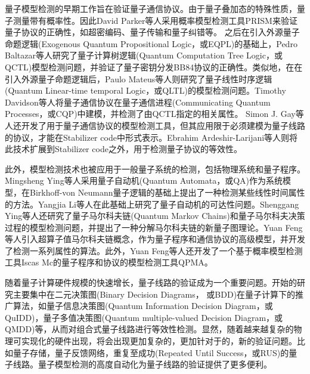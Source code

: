 量子模型检测的早期工作旨在验证量子通信协议。由于量子叠加态的特殊性质，量子测量带有概率性。因此David Parker等人采用概率模型检测工具PRISM\citep{kwiatkowska2004probabilistic}来验证量子协议的正确性，如超密编码、量子传输和量子纠错等。
之后在引入外源量子命题逻辑(Exogenous Quantum Propositional Logic，或EQPL)\citep{mateus2006weakly}的基础上，Pedro Baltazar等人研究了量子计算树逻辑(Quantum Computation Tree Logic，或QCTL)模型检测问题，并验证了量子密钥分发BB84协议\citep{bennett2014quantum}的正确性\citep{baltazar2008quantum,baltazar2007towards}。类似地，在在引入外源量子命题逻辑后，Paulo Mateus等人则研究了量子线性时序逻辑(Quantum Linear-time temporal Logic，或QLTL)的模型检测问题\citep{mateus2009temporal}。Timothy Davidson等人将量子通信协议在量子通信进程(Communicating Quantum Processes，或CQP)\citep{gay2005communicating}中建模，并检测了由QCTL指定的相关属性\citep{davidson2012formal,davidson2012model}。
Simon J. Gay等人还开发了用于量子通信协议的模型检测工具\citep{Gay,gay2010specification}，但其应用限于必须建模为量子线路的协议，才能在Stabilizer code\citep{gottesman1997stabilizer}中形式表示。Ebrahim Ardeshir-Larijani等人则将此技术扩展到Stabilizer code之外，用于检测量子协议的等效性\citep{ardeshir2013equivalence,ardeshir2014verification}。

此外，模型检测技术也被应用于一般量子系统的检测，包括物理系统和量子程序。Mingsheng Ying等人采用量子自动机(Quantum Automata，或QA)作为系统模型\citep{kondacs1997power}，在Birkhoff-von Neumann量子逻辑\citep{birkhoff1987logic}的基础上提出了一种检测某些线性时间属性的方法\citep{ying2014model}。Yangjia Li等人在此基础上研究了量子自动机的可达性问题\citep{li2014decidable}。Shenggang Ying等人还研究了量子马尔科夫链(Quantum Markov Chains)\citep{ying2013verification}和量子马尔科夫决策过程的模型检测问题，并提出了一种分解马尔科夫链的新量子图理论\citep{ying2013reachability,ying2018reachability}。Yuan Feng等人引入超算子值马尔科夫链概念，作为量子程序和通信协议的高级模型，并开发了检测一系列属性的算法\citep{feng2013model,feng2013reachability,feng2017model}。此外，Yuan Feng等人还开发了一个基于概率模型检测工具Iscas Mc\citep{hahn2014iscas}的量子程序和协议的模型检测工具QPMA\citep{feng2015qpmc}。

随着量子计算硬件规模的快速增长，量子线路的验证成为一个重要问题。开始的研究主要集中在二元决策图(Binary Decision Diagrams， 或BDD)在量子计算下的推广算法，如量子信息决策图(Quantum Information Decision Diagram，或QuIDD)\citep{Viamontes_2003}，量子多值决策图(Quantum multiple-valued Decision Diagram，或QMDD)\citep{Seiter_2013}等，从而对组合式量子线路进行等效性检测。显然，随着越来越复杂的物理可实现化的硬件出现，将会出现更加复杂的，更加针对于的，新的验证问题。比如量子存储\citep{Kerckhoff_2010}，量子反馈网络\citep{Gough_2008}，重复至成功(Repeated Until Success，或RUS)的量子线路\citep{Bocharov_2015}。量子模型检测的高度自动化为量子线路的验证提供了更多便利。


